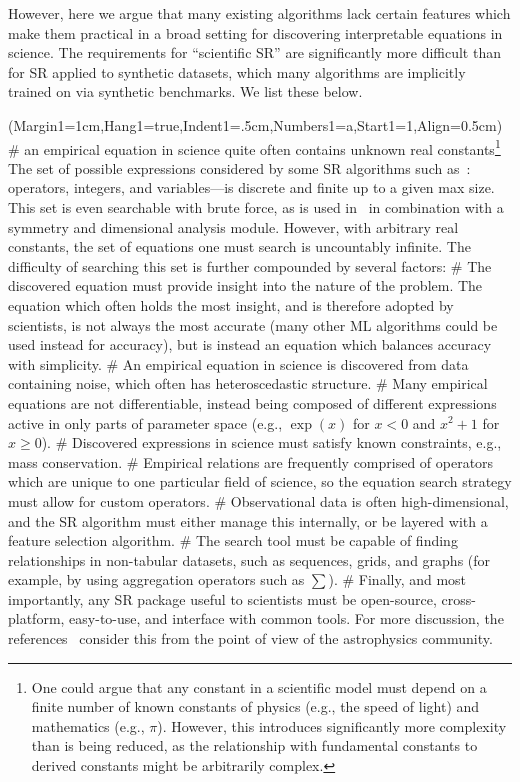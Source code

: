 \documentclass[letterpaper,twocolumn]{scrartcl}
\begin{document}
However, here we argue that many existing algorithms lack certain features which make them practical in a broad setting for discovering interpretable equations in science.
The requirements for ``scientific SR'' are significantly more difficult than for SR applied to synthetic datasets, which many algorithms are implicitly trained on via synthetic benchmarks.
We list these below.

\begin{easylist}
\ListProperties(Margin1=1cm,Hang1=true,Indent1=.5cm,Numbers1=a,Start1=1,Align=0.5cm)
#
an empirical equation in science quite often contains unknown real constants\footnote{One could argue that any constant in a scientific model must depend on a finite number of known constants of physics (e.g., the speed of light) and mathematics (e.g., $\pi$). However, this introduces significantly more complexity than is being reduced, as the relationship with fundamental constants to derived constants might be arbitrarily complex.}
The set of possible expressions considered by some SR algorithms such as~\cite{udrescuAIFeynmanParetooptimal2020}: operators, integers, and variables---is discrete and finite up to a given max size.
This set is even searchable with brute force, as is used in~\cite{udrescuAIFeynmanParetooptimal2020} in combination with a symmetry and dimensional analysis module.
However, with arbitrary real constants, the set of equations one must search is uncountably infinite.
The difficulty of searching this set is further compounded by several factors:
#
The discovered equation must provide insight into the nature of the problem.
The equation which often holds the most insight, and is therefore adopted by scientists, is not always the most accurate (many other ML algorithms could be used instead for accuracy), but is instead an equation which balances accuracy with simplicity.
#
An empirical equation in science is discovered from data containing noise, which often has heteroscedastic structure.
#
Many empirical equations are not differentiable, instead being composed of different expressions active in only parts of parameter space (e.g., $\exp(x)$ for $x<0$ and $x^2+1$ for $x\geq 0$).
#
Discovered expressions in science must satisfy known constraints, e.g., mass conservation.
#
Empirical relations are frequently comprised of operators which are unique to one particular field of science, so the equation search strategy must allow for custom operators.
#
Observational data is often high-dimensional, and the SR algorithm must either manage this internally, or be layered with a feature selection algorithm.
#
The search tool must be capable of finding relationships in non-tabular datasets, such as sequences, grids, and graphs (for example, by using aggregation operators such as $\sum$). #
Finally, and most importantly, any SR package useful to scientists must be open-source, cross-platform, easy-to-use, and interface with common tools.
For more discussion, the references~\cite{price-whelanAstropyProjectBuilding2018,astropycollaborationAstropyProjectSustaining2022} consider this from the point of view of the astrophysics community.
\end{easylist}
\end{document}
